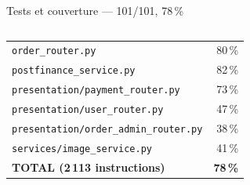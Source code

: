\documentclass[aspectratio=169,10pt]{beamer}
\begin{document}
\begin{frame}{Tests et couverture --- 101/101, 78\,\%}
\begin{columns}[T]
\begin{center}
\begin{tabular}{@{}p{4.2cm}r@{}}
      \texttt{order\_router.py}            & 80\,\% \\
      \texttt{postfinance\_service.py}     & 82\,\% \\
      \texttt{presentation/payment\_router.py}& 73\,\% \\
      \texttt{presentation/user\_router.py}& 47\,\% \\
      \rowcolor{myaccent!20}
      \texttt{presentation/order\_admin\_router.py}&38\,\% \\
      \rowcolor{myaccent!20}
      \texttt{services/image\_service.py}  & 41\,\% \\
      \midrule
      \textbf{TOTAL (2\,113 instructions)} & \textbf{78\,\%} \\
      \bottomrule
    \end{tabular}
    \end{center}
  \end{columns}
\end{frame}
\end{document}
